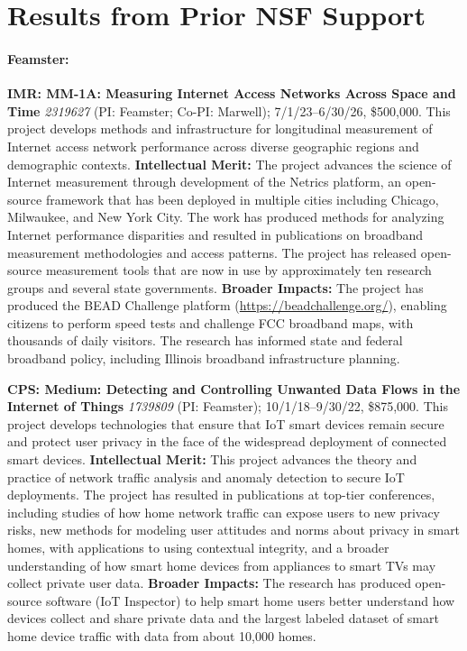 \section{Results from Prior NSF Support}

\paragraph{Feamster:}

\noindent
\textbf{IMR: MM-1A: Measuring Internet Access Networks Across Space and Time}
\textit{2319627} (PI: Feamster; Co-PI: Marwell); 7/1/23--6/30/26, \$500,000.
This project develops methods and infrastructure for longitudinal measurement
of Internet access network performance across diverse geographic regions and
demographic contexts.
\textbf{Intellectual Merit:} The project advances the science of Internet
measurement through development of the Netrics platform, an open-source
framework that has been deployed in multiple cities including Chicago,
Milwaukee, and New York City. The work has produced methods for analyzing
Internet performance disparities and resulted in publications on broadband
measurement methodologies and access patterns. The project has released
open-source measurement tools that are now in use by approximately ten
research groups and several state governments.
\textbf{Broader Impacts:} The project has produced the BEAD Challenge platform
(\url{https://beadchallenge.org/}), enabling citizens to perform speed tests
and challenge FCC broadband maps, with thousands of daily visitors. The
research has informed state and federal broadband policy, including Illinois
broadband infrastructure planning.

\noindent
\textbf{CPS: Medium: Detecting and Controlling Unwanted Data Flows in the
Internet of Things} \textit{1739809} (PI: Feamster); 10/1/18--9/30/22,
\$875,000. This project develops technologies that ensure that IoT smart
devices remain secure and protect user privacy in the face of the widespread
deployment of connected smart devices.
\textbf{Intellectual Merit:} This project advances the theory and practice of
network traffic analysis and anomaly detection to secure IoT deployments. The
project has resulted in publications at top-tier conferences, including studies
of how home network traffic can expose users to new privacy risks, new methods
for modeling user attitudes and norms about privacy in smart homes, with
applications to using contextual integrity, and a broader understanding of how
smart home devices from appliances to smart TVs may collect private user data.
\textbf{Broader Impacts:} The research has produced open-source software (IoT
Inspector) to help smart home users better understand how devices collect and
share private data and the largest labeled dataset of smart home device traffic
with data from about 10,000 homes.
